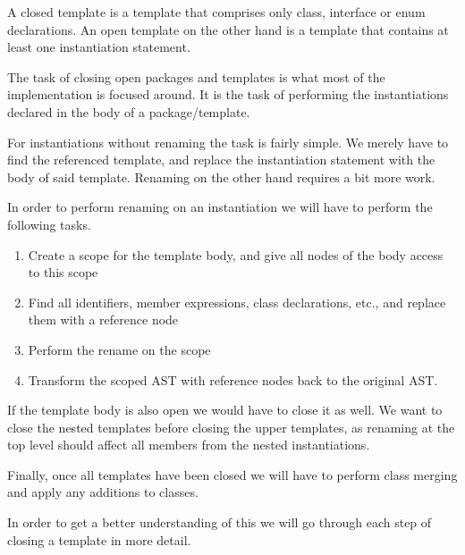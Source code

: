 A closed template is a template that comprises only class, interface or enum declarations.
An open template on the other hand is a template that contains at least one instantiation statement.

The task of closing open packages and templates is what most of the implementation is focused around.
It is the task of performing the instantiations declared in the body of a package/template.

For instantiations without renaming the task is fairly simple.
We merely have to find the referenced template, and replace the instantiation statement with the body of said template.
Renaming on the other hand requires a bit more work.

In order to perform renaming on an instantiation we will have to perform the following tasks.
\begin{enumerate}
    \item Create a scope for the template body, and give all nodes of the body access to this scope
    \item Find all identifiers, member expressions, class declarations, etc., and replace them with a reference node
    \item Perform the rename on the scope
    \item Transform the scoped AST with reference nodes back to the original AST.
\end{enumerate}

If the template body is also open we would have to close it as well.
We want to close the nested templates before closing the upper templates, as renaming at the top level should affect all members from the nested instantiations.

Finally, once all templates have been closed we will have to perform class merging and apply any additions to classes.

In order to get a better understanding of this we will go through each step of closing a template in more detail.

%
%

